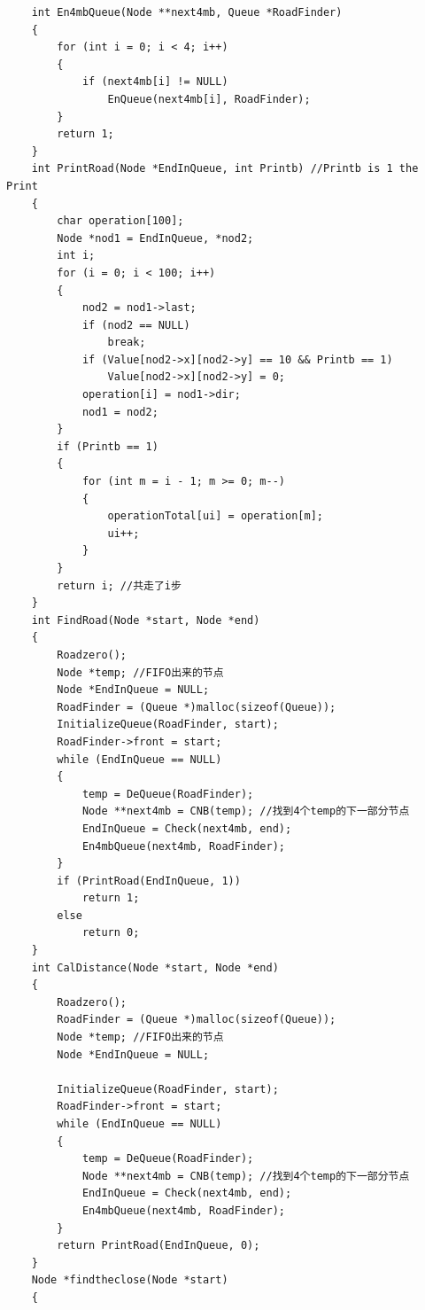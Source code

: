 \documentclass[UTF8]{ctexart}
\begin{document}
\begin{lstlisting}
    int En4mbQueue(Node **next4mb, Queue *RoadFinder)
    {
        for (int i = 0; i < 4; i++)
        {
            if (next4mb[i] != NULL)
                EnQueue(next4mb[i], RoadFinder);
        }
        return 1;
    }
    int PrintRoad(Node *EndInQueue, int Printb) //Printb is 1 the Print
    {
        char operation[100];
        Node *nod1 = EndInQueue, *nod2;
        int i;
        for (i = 0; i < 100; i++)
        {
            nod2 = nod1->last;
            if (nod2 == NULL)
                break;
            if (Value[nod2->x][nod2->y] == 10 && Printb == 1)
                Value[nod2->x][nod2->y] = 0;
            operation[i] = nod1->dir;
            nod1 = nod2;
        }
        if (Printb == 1)
        {
            for (int m = i - 1; m >= 0; m--)
            {
                operationTotal[ui] = operation[m];
                ui++;
            }
        }
        return i; //共走了i步
    }
    int FindRoad(Node *start, Node *end)
    {
        Roadzero();
        Node *temp; //FIFO出来的节点
        Node *EndInQueue = NULL;
        RoadFinder = (Queue *)malloc(sizeof(Queue));
        InitializeQueue(RoadFinder, start);
        RoadFinder->front = start;
        while (EndInQueue == NULL)
        {
            temp = DeQueue(RoadFinder);
            Node **next4mb = CNB(temp); //找到4个temp的下一部分节点
            EndInQueue = Check(next4mb, end);
            En4mbQueue(next4mb, RoadFinder);
        }
        if (PrintRoad(EndInQueue, 1))
            return 1;
        else
            return 0;
    }
    int CalDistance(Node *start, Node *end)
    {
        Roadzero();
        RoadFinder = (Queue *)malloc(sizeof(Queue));
        Node *temp; //FIFO出来的节点
        Node *EndInQueue = NULL;
    
        InitializeQueue(RoadFinder, start);
        RoadFinder->front = start;
        while (EndInQueue == NULL)
        {
            temp = DeQueue(RoadFinder);
            Node **next4mb = CNB(temp); //找到4个temp的下一部分节点
            EndInQueue = Check(next4mb, end);
            En4mbQueue(next4mb, RoadFinder);
        }
        return PrintRoad(EndInQueue, 0);
    }
    Node *findtheclose(Node *start)
    {
    

\end{lstlisting}
\end{document}

